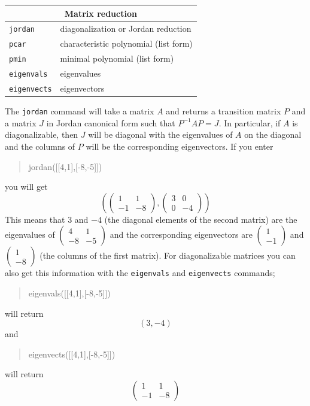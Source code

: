 \documentclass{article}
\newcommand{\xcasin}[1]
{\begin{quote}\ttfamily
#1
\end{quote}}
\newcommand{\xcasout}[1]
{\begin{equation*}
#1
\end{equation*}}
\begin{document}
\begin{center}
\begin{tabular}{|p{}|p{}|}
\hline
\multicolumn{2}{|c|}{\textbf{Matrix reduction}}\\
\hline\hline
\texttt{jordan} & diagonalization or Jordan reduction\\
\texttt{pcar} & characteristic polynomial (list form)\\
\texttt{pmin} & minimal polynomial (list form)\\
\texttt{eigenvals} & eigenvalues\\
\texttt{eigenvects} & eigenvectors\\
\hline
\end{tabular}
\end{center}

The \texttt{jordan} command will take a matrix $A$ and returns a
transition matrix $P$ and a matrix $J$ in Jordan canonical form such
that $P^{-1} A P = J$.  In particular, if $A$ is diagonalizable, then
$J$ will be diagonal with the eigenvalues of $A$ on the diagonal and
the columns of $P$ will be the corresponding eigenvectors.
If you enter
\xcasin{jordan([[4,1],[-8,-5]])}
you will get
\xcasout{
\left(\begin{pmatrix}1 & 1\\ -1 & -8 \end{pmatrix},
      \begin{pmatrix}3 & 0\\ 0 & -4 \end{pmatrix}\right)}
This means that $3$ and $-4$ (the diagonal elements of the second
matrix) are the eigenvalues of 
$\begin{pmatrix}4 & 1\\-8 & -5\end{pmatrix}$ and the corresponding
eigenvectors are $\begin{pmatrix}1\\-1\end{pmatrix}$ and
$\begin{pmatrix}1\\-8\end{pmatrix}$ (the columns of the first matrix).
For diagonalizable matrices you can also get this information with the
\texttt{eigenvals} and \texttt{eigenvects} commands;
\xcasin{eigenvals([[4,1],[-8,-5]])}
will return
\xcasout{(3,-4)}
and 
\xcasin{eigenvects([[4,1],[-8,-5]])}
will return
\xcasout{\begin{pmatrix}1 & 1\\ -1 & -8 \end{pmatrix}}
\end{document}

